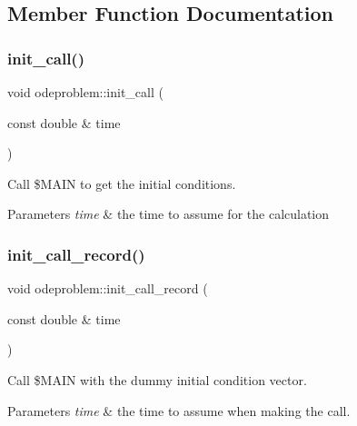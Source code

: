 \subsection{Member Function Documentation}
\mbox{\label{classodeproblem_a415e0001bfe1282764c339b6e8695ab8}} 
\subsubsection{\texorpdfstring{init\+\_\+call()}{init\_call()}}
{\footnotesize\ttfamily void odeproblem\+::init\+\_\+call (\begin{DoxyParamCaption}\item[{const double \&}]{time }\end{DoxyParamCaption})}

Call \$\+M\+A\+IN to get the initial conditions.


\begin{DoxyParams}{Parameters}
{\em time} & the time to assume for the calculation \\
\hline
\end{DoxyParams}
\mbox{\label{classodeproblem_adc4a5dbcc9561903a7aa81a90e8a908b}} 
\subsubsection{\texorpdfstring{init\+\_\+call\+\_\+record()}{init\_call\_record()}}
{\footnotesize\ttfamily void odeproblem\+::init\+\_\+call\+\_\+record (\begin{DoxyParamCaption}\item[{const double \&}]{time }\end{DoxyParamCaption})}

Call \$\+M\+A\+IN with the dummy initial condition vector.


\begin{DoxyParams}{Parameters}
{\em time} & the time to assume when making the call. \\
\hline
\end{DoxyParams}
\mbox{\label{classodeproblem_a62371ab3a7331c680da61c34e0a77390}} 
